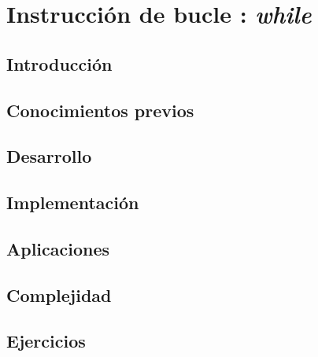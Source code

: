 \chapter{Instrucción de bucle : \emph{while} }
\section{Introducción}

\section{Conocimientos previos}

\section{Desarrollo}

\section{Implementación}

\section{Aplicaciones}

\section{Complejidad}

\section{Ejercicios}
